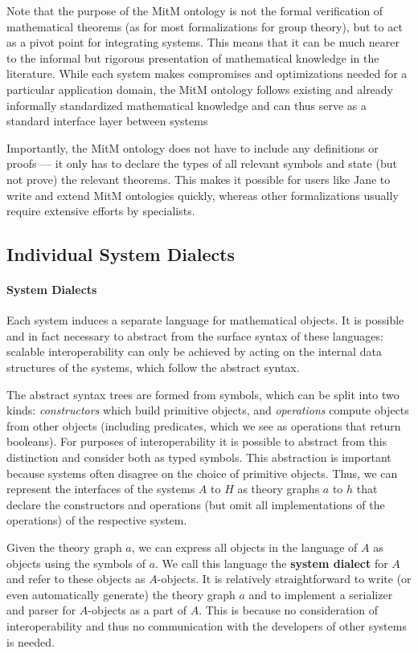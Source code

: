 Note that the purpose of the MitM ontology is not the formal verification of
mathematical theorems (as for most formalizations
 for group theory), but to act as a pivot point for
integrating systems. This means that it can be much nearer to the informal but
rigorous presentation of mathematical knowledge in the literature. While each
system makes compromises and optimizations needed for a particular application
domain, the MitM ontology follows existing and already informally standardized
mathematical knowledge and can thus serve as a standard interface layer between
systems

Importantly, the MitM ontology does not have to include any definitions or
proofs --- it only has to declare the types of all relevant symbols and state
(but not prove) the relevant theorems. This makes it possible for users like
Jane to write and extend MitM ontologies quickly, whereas other formalizations
usually require extensive efforts by specialists.

\subsection{Individual System Dialects}\label{sec:mitm:dialect}

\paragraph{System Dialects}
Each system induces a separate language for mathematical objects. It is possible
and in fact necessary to abstract from the surface syntax of these languages:
scalable interoperability can only be achieved by acting on the internal data
structures of the systems, which follow the abstract syntax.

The abstract syntax trees are formed from symbols, which can be split into two
kinds: \emph{constructors} which build primitive objects, and \emph{operations}
compute objects from other objects (including predicates, which we see as
operations that return booleans). For purposes of interoperability it is
possible to abstract from this distinction and consider both as typed symbols.
This abstraction is important because systems often disagree on the choice of
primitive objects. Thus, we can represent the interfaces of the systems $A$ to
$H$ as \OMMT theory graphs $a$ to $h$ that declare the constructors and
operations (but omit all implementations of the operations) of the respective
system.

Given the theory graph $a$, we can express all objects in the language of $A$ as
\OMMT objects using the symbols of $a$. We call this language the \textbf{\OMMT
system dialect} for $A$ and refer to these objects as $A$-objects. It is
relatively straightforward to write (or even automatically generate) the theory
graph $a$ and to implement a serializer and parser for $A$-objects as a part of
$A$. This is because no consideration of interoperability and thus no
communication with the developers of other systems is needed.

